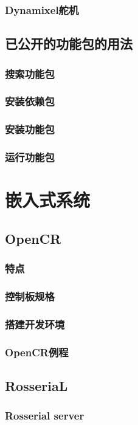 \documentclass[geye,green,kindle,cn]{elegantnote}
\begin{document}
\subsubsection{Dynamixel舵机}
\subsection{已公开的功能包的用法}
\subsubsection{搜索功能包}
\subsubsection{安装依赖包}
\subsubsection{安装功能包}
\subsubsection{运行功能包}
\section{嵌入式系统}
\subsection{OpenCR}
\subsubsection{特点}
\subsubsection{控制板规格}
\subsubsection{搭建开发环境}
\subsubsection{OpenCR例程}
\subsection{RosseriaL}
\subsubsection{Rosserial server}
\end{document}

